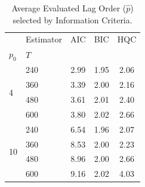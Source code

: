 \begin{table}[htbp]
\centering
\caption{Average Evaluated Lag Order ($\hat{p}$) selected by Information Criteria.}
\label{tab:ic_lag_orders}
\begin{tabular}{llccc}
\toprule
 & Estimator & AIC & BIC & HQC \\
$p_0$ & $T$ &  &  &  \\
\midrule
\multirow[t]{4}{*}{4} & 240 & 2.99 & 1.95 & 2.06 \\
 & 360 & 3.39 & 2.00 & 2.16 \\
 & 480 & 3.61 & 2.01 & 2.40 \\
 & 600 & 3.80 & 2.02 & 2.66 \\
\multirow[t]{4}{*}{10} & 240 & 6.54 & 1.96 & 2.07 \\
 & 360 & 8.53 & 2.00 & 2.23 \\
 & 480 & 8.96 & 2.00 & 2.66 \\
 & 600 & 9.16 & 2.02 & 4.03 \\
\bottomrule
\end{tabular}
\end{table}
